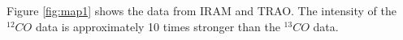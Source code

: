 
Figure \ref{fig:map1} shows the data from IRAM and TRAO. The intensity of the $^{12}CO$ data is approximately 10 times stronger than the $^{13}CO$ data.

